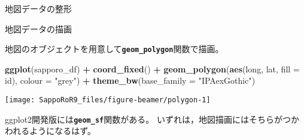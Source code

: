 \documentclass[ignorenonframetext,]{beamer}
\newenvironment{Shaded}{\begin{snugshade}}{\end{snugshade}}
\newcommand{\KeywordTok}[1]{\textcolor[rgb]{0.13,0.29,0.53}{\textbf{#1}}}
\newcommand{\DataTypeTok}[1]{\textcolor[rgb]{0.13,0.29,0.53}{#1}}
\newcommand{\DecValTok}[1]{\textcolor[rgb]{0.00,0.00,0.81}{#1}}
\newcommand{\StringTok}[1]{\textcolor[rgb]{0.31,0.60,0.02}{#1}}
\newcommand{\OperatorTok}[1]{\textcolor[rgb]{0.81,0.36,0.00}{\textbf{#1}}}
\newcommand{\NormalTok}[1]{#1}
\let\oldShaded\Shaded
\let\endoldShaded\endShaded
\renewenvironment{Shaded}{\footnotesize\oldShaded}{\endoldShaded}
\begin{document}
\begin{frame}[fragile]{地図データの整形}

\begin{Shaded}
\end{Shaded}

\end{frame}

\begin{frame}[fragile]{地図データの描画}

地図のオブジェクトを用意して\textbf{\texttt{geom\_polygon}}関数で描画。

\begin{Shaded}
\begin{Highlighting}[]
\KeywordTok{ggplot}\NormalTok{(sapporo_df) }\OperatorTok{+}\StringTok{ }\KeywordTok{coord_fixed}\NormalTok{() }\OperatorTok{+}
\StringTok{  }\KeywordTok{geom_polygon}\NormalTok{(}\KeywordTok{aes}\NormalTok{(long, lat, }\DataTypeTok{fill =}\NormalTok{ id), }\DataTypeTok{colour =} \StringTok{"grey"}\NormalTok{) }\OperatorTok{+}
\StringTok{  }\KeywordTok{theme_bw}\NormalTok{(}\DataTypeTok{base_family =} \StringTok{"IPAexGothic"}\NormalTok{)}
\end{Highlighting}
\end{Shaded}

\texttt{[image: SappoRoR9\_files/figure-beamer/polygon-1]}

\small ggplot2開発版には\textbf{\texttt{geom\_sf}}関数がある。
いずれは，地図描画にはそちらがつかわれるようになるはず。

\end{frame}
\end{document}
